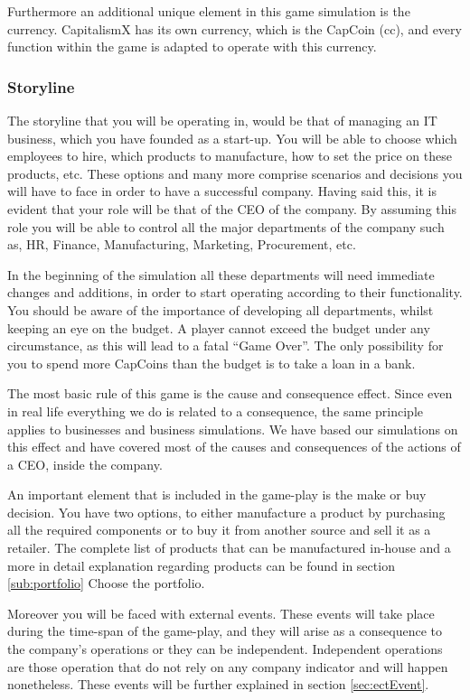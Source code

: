 \documentclass[11pt,titlepage,oneside,openany]{book}
\begin{document}
Furthermore an additional unique element in this game simulation is the currency. CapitalismX has its own currency, which is the CapCoin (\gls{cc}), and every function within the game is adapted to operate with this currency.
\subsubsection{Storyline}
 The storyline that you will be operating in, would be that of managing an IT business, which you have founded as a start-up. You will be able to choose which employees to hire, which products to manufacture,  how to set the price on these products, etc. These options and many more comprise scenarios and decisions you will have to face in order to have a successful company. Having said this, it is evident that your role will be that of the CEO of the company. By assuming this role you will be able to control all the major departments of the company such as, HR, Finance, Manufacturing, Marketing, Procurement, etc. 
 
In the beginning of the simulation all these departments will need immediate changes and additions, in order to start operating according to their functionality. You should be aware of the importance of developing all departments, whilst keeping an eye on the budget. A player cannot exceed the budget under any circumstance, as this will lead to a fatal “Game Over”. The only possibility for you to spend more CapCoins than the budget is to take a loan in a bank. 

The most basic rule of this game is the cause and consequence effect. Since even in real life everything we do is related to a consequence, the same principle applies to businesses and business simulations. We have based our simulations on this effect and have covered most of the causes and consequences of the actions of a CEO, inside the company. 

An important element that is included in the game-play is the make or buy decision. You have two options, to either manufacture a product by purchasing all the required components or to buy it from another source and sell it as a retailer. The complete list of products that can be manufactured in-house and a more in detail explanation regarding products can be found in section \ref{sub:portfolio} Choose the portfolio. 

Moreover you will be faced with external events. These events will take place during the time-span of the game-play, and they will arise as a consequence to the company’s operations or they can be independent. Independent operations are those operation that do not rely on any company indicator and will happen nonetheless. These events will be further explained in section \ref{sec:ectEvent}.	
\end{document}
